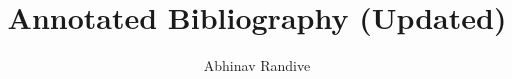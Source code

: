 \documentclass[12pt]{article}
\title{\textbf{Annotated Bibliography (Updated)}}
\author{Abhinav Randive}
\begin{document}
\maketitle

\nocite{*}



\end{document}
